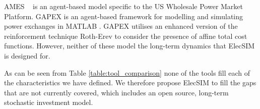 AMES ~\cite{Sun2007} is an agent-based model specific to the US Wholesale Power Market Platform. GAPEX \cite{Cincotti2013} is an agent-based framework for modelling and simulating power exchanges in MATLAB . GAPEX utilises an enhanced version of the reinforcement technique Roth-Erev to consider the presence of affine total cost functions. However, neither of these model the long-term dynamics that ElecSIM is designed for.

As can be seen from Table \ref{table:tool_comparison} none of the tools fill each of the characteristics we have defined. We therefore propose ElecSIM to fill the gaps that are not currently covered, which includes an open source, long-term stochastic investment model. 






